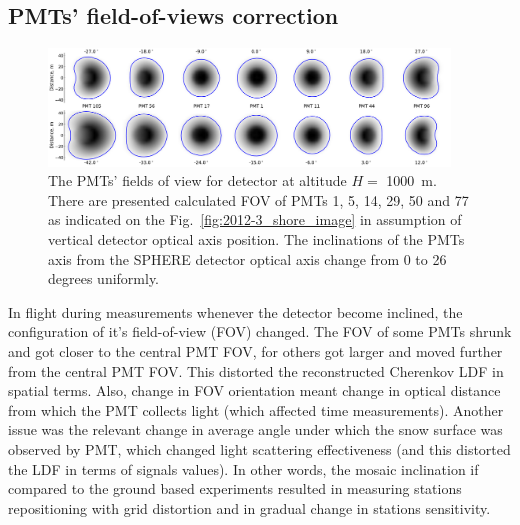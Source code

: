 \documentclass[final,5p,times,twocolumn]{elsarticle}
\begin{document}


\subsection{PMTs' field-of-views correction}

\begin{figure}[bth]
\centering
    \includegraphics[width=0.95\textwidth]{figs/fov_inclined.pdf}
    \caption{The PMTs' fields of view for detector at altitude $H=$ 1000~m. There are presented calculated FOV of PMTs 1, 5, 14, 29, 50 and 77 as indicated on the Fig.~\ref{fig:2012-3_shore_image} in assumption of vertical detector optical axis position. The inclinations of the PMTs axis from the SPHERE detector optical axis change from 0 to 26 degrees uniformly.%
    }
\label{fig:pmt_fov}
\end{figure}

In flight during measurements whenever the detector become inclined, the configuration of it's field-of-view (FOV) changed. The FOV of some PMTs shrunk and got closer to the central PMT FOV, for others got larger and moved further from the central PMT FOV. This distorted the reconstructed Cherenkov LDF in spatial terms. Also, change in FOV orientation meant change in optical distance from which the PMT collects light (which affected time measurements). Another issue was the relevant change in average angle under which the snow surface was observed by PMT, which changed light scattering effectiveness (and this distorted the LDF in terms of signals values). In other words, the mosaic inclination if compared to the ground based experiments resulted in measuring stations repositioning with grid distortion and in gradual change in stations sensitivity.
\end{document}
